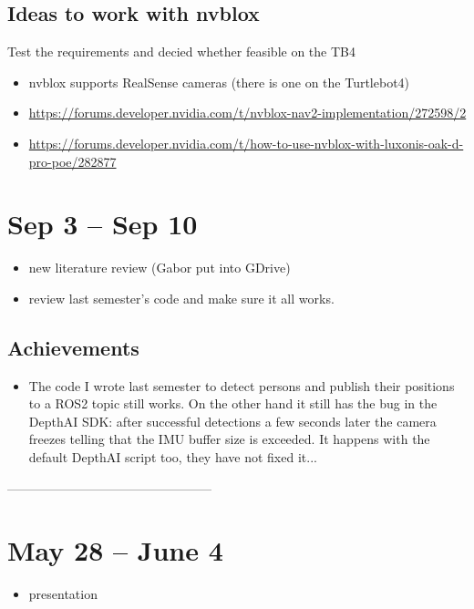\documentclass{article}
\begin{document}
\subsection{Ideas to  work with nvblox}
Test the requirements and decied whether feasible on the TB4
\begin{itemize}
    \item nvblox supports RealSense cameras (there is one on the Turtlebot4)
    \item \url{https://forums.developer.nvidia.com/t/nvblox-nav2-implementation/272598/2}
    \item \url{https://forums.developer.nvidia.com/t/how-to-use-nvblox-with-luxonis-oak-d-pro-poe/282877}
\end{itemize}


\newpage

\section{Sep 3 -- Sep 10}
\begin{itemize}
\item new literature review (Gabor put into GDrive) 
\item review last semester's code and make sure it all works. 
\end{itemize}

\subsection{Achievements}
\begin{itemize}
    \item The code I wrote last semester to detect persons and publish their positions to a ROS2 topic still works. On the other hand it still has the bug in the DepthAI SDK: after successful detections a few seconds later the camera freezes telling that the IMU buffer size is exceeded. It happens with the default DepthAI script too, they have not fixed it...
\end{itemize}

------------------------------------------------




\section{May 28 -- June 4}
\begin{itemize}
\item presentation 
\end{itemize}
\end{document}
